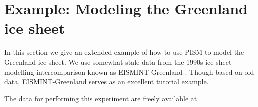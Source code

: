 \documentclass[11pt,final]{amsart}
\begin{document}

\clearpage\newpage
\section{Example: Modeling the Greenland ice sheet}\label{sect:green}   In this section we give an extended example of how to use PISM to model the Greenland ice sheet.  We use somewhat stale data from the 1990s ice sheet modelling intercomparison known as EISMINT-Greenland \cite{HuybrechtsEISMINT,RitzEISMINT}.  Though based on old data, EISMINT-Greenland serves as an excellent tutorial example.

The data for performing this experiment are freely available at
\medskip

\centerline{}
\medskip
\end{document}
